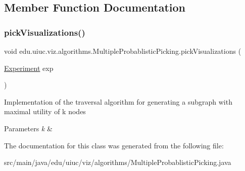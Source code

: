 \subsection{Member Function Documentation}
\mbox{\label{classedu_1_1uiuc_1_1viz_1_1algorithms_1_1_multiple_probablistic_picking_a2242e3dcbae46fe66872bbe6fe912049}} 
\subsubsection{\texorpdfstring{pickVisualizations()}{pickVisualizations()}}
{\footnotesize\ttfamily void edu.\+uiuc.\+viz.\+algorithms.\+Multiple\+Probablistic\+Picking.\+pick\+Visualizations (\begin{DoxyParamCaption}\item[{\mbox{\hyperlink{classedu_1_1uiuc_1_1viz_1_1algorithms_1_1_experiment}{Experiment}}}]{exp }\end{DoxyParamCaption})}

Implementation of the traversal algorithm for generating a subgraph with maximal utility of k nodes


\begin{DoxyParams}{Parameters}
{\em k} & \\
\hline
\end{DoxyParams}


The documentation for this class was generated from the following file\+:\begin{DoxyCompactItemize}
\item 
src/main/java/edu/uiuc/viz/algorithms/Multiple\+Probablistic\+Picking.\+java\end{DoxyCompactItemize}
